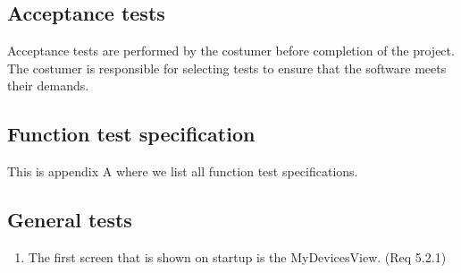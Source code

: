 \documentclass[a4paper]{article}
\begin{document}
\subsection{Acceptance tests}
Acceptance tests are performed by the costumer before completion of the project. The costumer is responsible for selecting tests to ensure that the software meets their demands.

\newpage
\begin{appendices}

\section{Function test specification} \label{appendix:section:functiontest}
This is appendix A where we list all function test specifications.

\subsection{General tests}
%
%
\begin{enumerate}[label=\bfseries Test \thesubsection.\arabic*,labelwidth=\widthof{\text{Test 10.10.10}},leftmargin=!]
	\item The first screen that is shown on startup is the MyDevicesView. (Req 5.2.1)



\end{enumerate}
\end{appendices}
\end{document}

